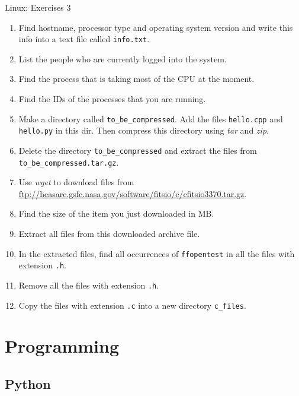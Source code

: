 \documentclass{beamer}
\begin{document}
\begin{frame}{Linux: Exercises 3}
  \fontsize{8pt}{8}\selectfont
  \begin{enumerate}
    \item Find hostname, processor type and operating system version and write this info into a text file called \texttt{info.txt}.
    \item List the people who are currently logged into the system.
    \item Find the process that is taking most of the CPU at the moment.
    \item Find the IDs of the processes that you are running.
    \item Make a directory called \texttt{to\_be\_compressed}. Add the files \texttt{hello.cpp} and \texttt{hello.py} in this dir.
    Then compress this directory using \textit{tar} and \textit{zip}.
    \item Delete the directory \texttt{to\_be\_compressed} and extract the files from \texttt{to\_be\_compressed.tar.gz}.
    \item Use \textit{wget} to download files from \url{ftp://heasarc.gsfc.nasa.gov/software/fitsio/c/cfitsio3370.tar.gz}.
    \item Find the size of the item you just downloaded in MB.
    \item Extract all files from this downloaded archive file.
    \item In the extracted files, find all occurrences of \texttt{ffopentest} in all the files with extension \texttt{.h}.
    \item Remove all the files with extension \texttt{.h}.
    \item Copy the files with extension \texttt{.c} into a new directory \texttt{c\_files}.
  \end{enumerate}
\end{frame}

\section{Programming}
\subsection{Python}
\end{document}
